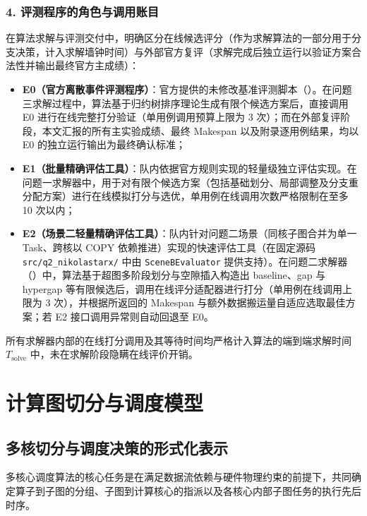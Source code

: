 \documentclass[anonymous,notoc]{gmcm2026}
\providecommand{\tightlist}{\setlength{\itemsep}{0pt}\setlength{\parskip}{0pt}}
\begin{document}
\subsubsection{4. 评测程序的角色与调用账目}

在算法求解与评测交付中，明确区分在线候选评分（作为求解算法的一部分用于分支决策，计入求解墙钟时间）与外部官方复评（求解完成后独立运行以验证方案合法性并输出最终官方主成绩）：

\begin{itemize}
\tightlist
\item
  \textbf{E0（官方离散事件评测程序）}：官方提供的未修改基准评测脚本（\texttt{}）。在问题三求解过程中，算法基于归约树排序理论生成有限个候选方案后，直接调用 E0 进行在线完整打分验证（单用例调用预算上限为 3 次）；而在外部复评阶段，本文汇报的所有主实验成绩、最终 Makespan 以及附录逐用例结果，均以 E0 的独立运行输出为最终确认标准；
\item
  \textbf{E1（批量精确评估工具）}：队内依据官方规则实现的轻量级独立评估实现。在问题一求解器中，用于对有限个候选方案（包括基础划分、局部调整及分支重分配方案）进行在线模拟打分与选优，单用例在线调用次数严格限制在至多 10 次以内；
\item
  \textbf{E2（场景二轻量精确评估工具）}：队内针对问题二场景（同核子图合并为单一 Task、跨核以 COPY 依赖推进）实现的快速评估工具（在固定源码 \texttt{src/q2\_nikolastarx/} 中由 \texttt{SceneBEvaluator} 提供支持）。在问题二求解器（\texttt{}）中，算法基于超图多阶段划分与空隙插入构造出 baseline、gap 与 hypergap 等有限候选后，调用在线评分适配器进行打分（单用例在线调用上限为 3 次），并根据所返回的 Makespan 与额外数据搬运量自适应选取最佳方案；若 E2 接口调用异常则自动回退至 E0。
\end{itemize}

所有求解器内部的在线打分调用及其等待时间均严格计入算法的端到端求解时间 \(T_{\text{solve}}\) 中，未在求解阶段隐瞒在线评价开销。


\section{计算图切分与调度模型}

\subsection{多核切分与调度决策的形式化表示}

多核心调度算法的核心任务是在满足数据流依赖与硬件物理约束的前提下，共同确定算子到子图的分组、子图到计算核心的指派以及各核心内部子图任务的执行先后时序。
\end{document}
